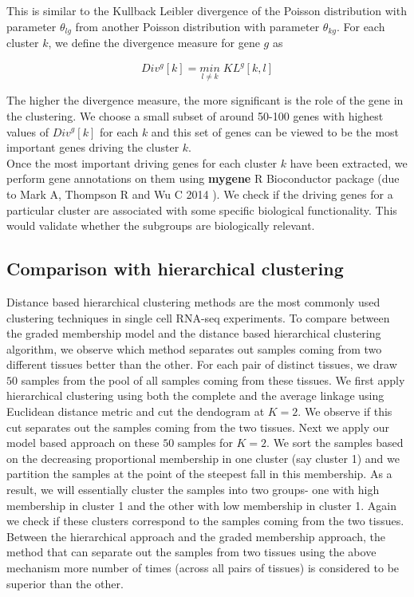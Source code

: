 This is similar to the Kullback Leibler divergence of the Poisson distribution with parameter $ \theta_{lg}$ from another Poisson distribution with parameter $ \theta_{kg}$. For each cluster $k$, we define the divergence measure for gene $g$ as 

$$ Div^{g}[k] = \underset{l \neq k}{min} \; KL^{g} [k, l] $$

The higher the divergence measure, the more significant is the role of the gene in the clustering. We choose a small subset of around 50-100 genes with highest values of $Div^{g}[k]$ for each $k$ and this set of genes can be viewed to be the most important genes driving the cluster $k$.  \\[1 pt]

Once the most important driving genes for each cluster $k$ have been extracted, we perform gene annotations on them using \textbf{mygene} R Bioconductor package (due to Mark A, Thompson R and Wu C  2014 \cite{Thompson2014}). We check if the driving genes for a particular cluster are associated with some specific biological functionality. This would validate whether the subgroups are biologically relevant. 

\subsection{Comparison with hierarchical clustering}

Distance based hierarchical clustering methods are the most commonly used clustering techniques in single cell RNA-seq experiments. To compare between the graded membership model and the distance based hierarchical clustering algorithm, we observe which method separates out samples coming from two different tissues better than the other. For each pair of distinct tissues,  we draw $50$ samples from the pool of all samples coming from these tissues. We first apply hierarchical clustering using both the complete and the average linkage using Euclidean distance metric and cut the dendogram at $K=2$.  We observe if this cut separates out the samples coming from the two tissues.  Next we apply our model based approach on these $50$ samples for $K=2$. We sort the samples based on the decreasing  proportional membership in one cluster (say cluster 1) and we partition the samples at the point of the steepest fall in this membership. As a result, we will essentially cluster the samples into two groups- one with high membership in cluster 1 and the other with low membership in cluster 1. Again we check if  these clusters correspond to the samples coming from the two tissues. Between the hierarchical approach and the graded membership approach, the method that can separate out the samples from two tissues using the above mechanism more number of times (across all pairs of tissues) is considered to be superior than the other. 


